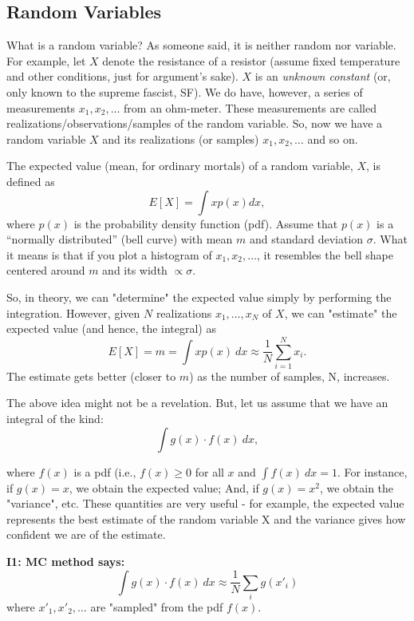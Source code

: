 \documentclass[11pt,onecolumn]{article}
\begin{document}
\subsection{Random Variables}
What is a random variable? As someone said, it is neither random nor variable. For example, let $X$ denote the resistance of a resistor (assume fixed temperature and other conditions, just for argument's sake). $X$ is an {\em unknown constant} (or, only known to the supreme fascist, SF). We do have, however, a series of measurements $x_1, x_2, \dots $ from an ohm-meter. These measurements are called realizations/observations/samples of the random variable. So, now we have a random variable $X$ and its realizations (or samples) $x_1, x_2, \dots $ and so on.

The expected value (mean, for ordinary mortals) of a random variable, $X$, is defined as
\[
E[X] = \int x p(x) dx,
\]
where $p(x)$ is the probability density function (pdf). Assume that $p(x)$ is a ``normally distributed'' (bell curve) with mean $m$ and standard deviation $\sigma$. What it means is that if you plot a histogram of  $x_1, x_2, \dots $, it resembles the bell shape centered around  $m$ and its width $\propto \sigma$.

So, in theory, we can "determine" the expected value simply by performing the integration. However, given $N$ realizations $x_1,\dots,x_N$ of $X$, we can "estimate" 
the expected value (and hence, the integral) as
\[
E[X] = m =  \int x p(x)~ dx \approx \frac{1}{N} \sum_{i=1}^N x_i.
\] 
The estimate gets better (closer to $m$) as the number of samples, N, increases.

The above idea might not be a revelation. But, let us assume that we have an integral of the kind:
\[
\int  g(x) \cdot f(x)~ dx ,
\]

where $f(x)$ is a pdf (i.e., $f(x) \ge 0$ for all $x$ and $\int f(x)~dx = 1$.
For instance, if $g(x) = x$, we obtain the expected value; And, if $g(x) = x^2$, we obtain the 
"variance", etc. These quantities are very useful - for example, the expected 
 value represents the best estimate of the random variable X and the variance 
 gives how confident we are of the estimate.

{\bf I1: MC method says:}
\[
\int g(x) \cdot f(x) ~ dx \approx \frac{1}{N} \sum_i g(x'_i)
\]
where $x'_1, x'_2,\dots$ are "sampled" from the pdf $f(x)$.
% 
\end{document}
